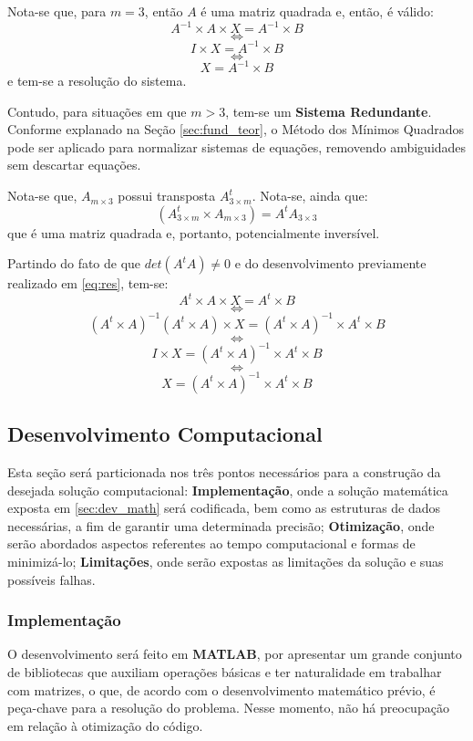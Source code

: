 	Nota-se que, para $m=3$, então $A$ é uma matriz quadrada e, então, é válido:
	\[A^{-1}\times A \times X = A^{-1}\times B\]
	$$\iff$$
	\[I \times X = A^{-1}\times B \]
	$$\iff$$
	\[X = A^{-1}\times B\]
	e tem-se a resolução do sistema.

	Contudo, para situações em que $m>3$, tem-se um \textbf{Sistema Redundante}. Conforme explanado na
	Seção \ref{sec:fund_teor}, o Método dos Mínimos Quadrados pode ser aplicado
	para normalizar sistemas de equações, removendo ambiguidades sem descartar equações.

	Nota-se que, $A_{m\times3}$ possui transposta $A_{3\times m}^t$. Nota-se, ainda que:
	$$(A^t_{3\times m} \times A_{m\times3}) = A^tA_{3\times3}$$
	que é uma matriz quadrada e, portanto, potencialmente inversível.

	Partindo do fato de que $det(A^tA) \neq 0$ e do desenvolvimento previamente realizado em \ref{eq:res},
	tem-se:
	\[A^t \times A \times X = A^t \times B\]
	$$\iff$$
	\[(A^t\times A)^{-1}(A^t \times A) \times X = (A^t\times A)^{-1} \times A^t \times B\]
	$$\iff$$
	\[I \times X = (A^t\times A)^{-1} \times A^t \times B\]
	$$\iff$$
	\begin{equation}\label{eq:final}X = (A^t\times A)^{-1} \times A^t \times B\end{equation}

	\subsection{Desenvolvimento Computacional}
	\label{sec:dev_comp}
	Esta seção será particionada nos três pontos necessários para a construção da desejada solução
	computacional: \textbf{Implementação}, onde a solução matemática exposta em \ref{sec:dev_math}
	será codificada, bem como as estruturas de dados necessárias, a fim de garantir uma determinada
	precisão; \textbf{Otimização}, onde serão abordados aspectos referentes ao tempo computacional
	e formas de minimizá-lo; \textbf{Limitações}, onde serão expostas as limitações da solução e suas
	possíveis falhas.
	\subsubsection{Implementação}
	\label{sec:imple}
	O desenvolvimento será feito em \textbf{MATLAB}, por apresentar um grande conjunto de bibliotecas
	que auxiliam operações básicas e ter naturalidade em trabalhar com matrizes, o que, de acordo com o
	desenvolvimento matemático prévio, é peça-chave para a resolução do problema. Nesse momento,
	não há preocupação em relação à otimização do código.

